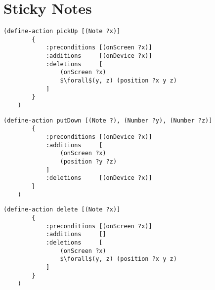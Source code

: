 \section{Sticky Notes}

\begin{lstlisting}[caption=pickUp,mathescape=true]
    (define-action pickUp [(Note ?x)]
        {
            :preconditions [(onScreen ?x)]
            :additions     [(onDevice ?x)]
            :deletions     [
                (onScreen ?x)
                $\forall$(y, z) (position ?x y z)
            ]
        }
    )
\end{lstlisting}

\begin{lstlisting}[caption=putDown]
    (define-action putDown [(Note ?), (Number ?y), (Number ?z)]
        {
            :preconditions [(onDevice ?x)]
            :additions     [
                (onScreen ?x)
                (position ?y ?z)
            ]
            :deletions     [(onDevice ?x)]
        }
    )
\end{lstlisting}

\begin{lstlisting}[caption=delete,mathescape=true]
    (define-action delete [(Note ?x)]
        {
            :preconditions [(onScreen ?x)]
            :additions     []
            :deletions     [
                (onScreen ?x)
                $\forall$(y, z) (position ?x y z)
            ]
        }
    )
\end{lstlisting}
